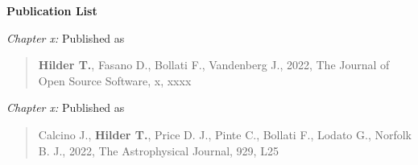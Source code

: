 \thispagestyle{plain}


\begin{center}
    
    {\Large \textbf{Publication List}}
    
\end{center}

\setlength{\parindent}{0pt}

\textit{Chapter x:} Published as

\begin{quote}
    \textbf{Hilder T.}, Fasano D., Bollati F., Vandenberg J., 2022, The Journal of Open Source Software, x, xxxx
\end{quote}

\textit{Chapter x:} Published as

\begin{quote}
    Calcino J., \textbf{Hilder T.}, Price D. J., Pinte C., Bollati F., Lodato G., Norfolk B. J., 2022, The Astrophysical Journal, 929, L25
\end{quote}

\setlength{\parindent}{15pt}
\newpage